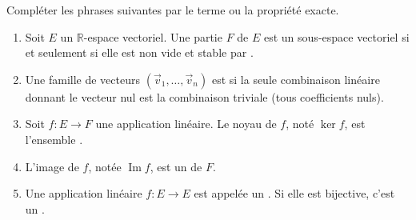 \documentclass[11pt]{article}
\begin{document}
\begin{exercice}
Compléter les phrases suivantes par le terme ou la propriété exacte.
\begin{enumerate}
    \item Soit $E$ un $\mathbb{R}$-espace vectoriel. Une partie $F$ de $E$ est un sous-espace vectoriel si et seulement si elle est non vide et stable par \underline{\hspace{4cm}}.
    \item Une famille de vecteurs $( \vec{v}_1, \dots, \vec{v}_n )$ est \underline{\hspace{4cm}} si la seule combinaison linéaire donnant le vecteur nul est la combinaison triviale (tous coefficients nuls).
    \item Soit $f : E \to F$ une application linéaire. Le noyau de $f$, noté $\ker f$, est l'ensemble \underline{\hspace{4cm}}.
    \item L'image de $f$, notée $\operatorname{Im} f$, est un \underline{\hspace{4cm}} de $F$.
    \item Une application linéaire $f : E \to E$ est appelée un \underline{\hspace{4cm}}. Si elle est bijective, c'est un \underline{\hspace{4cm}}.
\end{enumerate}
\end{exercice}
\end{document}
